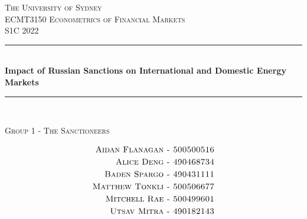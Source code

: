 \documentclass[letterpaper,10pt]{article}
\begin{document}
\begin{titlepage}

\newcommand{\HRule}{\rule{\linewidth}{0.5mm}} %

\center %
 

\textsc{\LARGE The University of Sydney}\\[1.5cm] %
\vspace{2.5cm}
\textsc{\Large ECMT3150 Econometrics of Financial Markets}\\[0.5cm] %
\textsc{\large S1C 2022}\\[0.5cm] %


\HRule \\[0.4cm]
{ \LARGE \bfseries Impact of Russian Sanctions on International and Domestic Energy Markets}\\[0.4cm] %
\HRule \\[1.5cm]
 


\begin{minipage}{0.8\textwidth}
\vspace{0.5cm}
\begin{center}

\textsc{\large Group 1 - The Sanctioneers}\\
\end{center}
\begin{flushleft} \large
\begin{align*}
    \textsc{Aidan Flanagan - 500500516}\\
    \textsc{Alice Deng - 490468734}\\
    \textsc{Baden Spargo - 490431111}\\
    \textsc{Matthew Tonkli - 500506677}\\
    \textsc{Mitchell Rae - 500499601}\\
    \textsc{Utsav Mitra - 490182143}\\
\end{align*}


\end{flushleft}
\end{minipage}
\end{titlepage}
\end{document}
